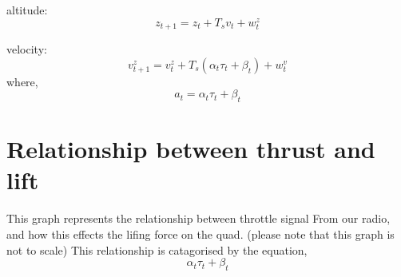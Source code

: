 \documentclass{article}
\begin{document}
altitude:
\begin{equation}
    z_{t+1} = z_t + {T_s}{v_t} + w^{z}_{t}
\end{equation}

velocity:
\begin{equation}
    v^{z}_{t+1} = v^{z}_t + T_s({\alpha_t}{\tau_t} + \beta_t) + w^{v}_t
\end{equation}
where, 
\begin{equation}
    a_t =
    {\alpha_t}{\tau_t} + \beta_t
\end{equation}

\section{Relationship between thrust and lift}
\begin{figure}[H]
    \centering
    \label{fig:fig1}
    \caption{}
\end{figure}
This graph represents the relationship between throttle signal 
From our radio, and how this effects the lifing force on the quad.
(please note that this graph is not to scale)
This relationship is catagorised by the equation, 
\[
\alpha_t\tau_t + \beta_t
\]
\end{document}
